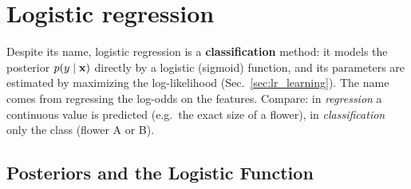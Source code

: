 \clearpage

\newpage

\section{Logistic regression}

Despite its name, logistic regression is a \textbf{classification} method: it models the posterior $p(y\mid\bm{\mathrm{x}})$ directly by a logistic (sigmoid) function, and its parameters are estimated by maximizing the log-likelihood (Sec.~\ref{sec:lr_learning}). The name comes from regressing the log-odds on the features. Compare: in \emph{regression} a continuous value is predicted (e.g.\ the exact size of a flower), in \emph{classification} only the class (flower A or B).\autocite{hastie2009,bishop2006}

\subsection{Posteriors and the Logistic Function}

